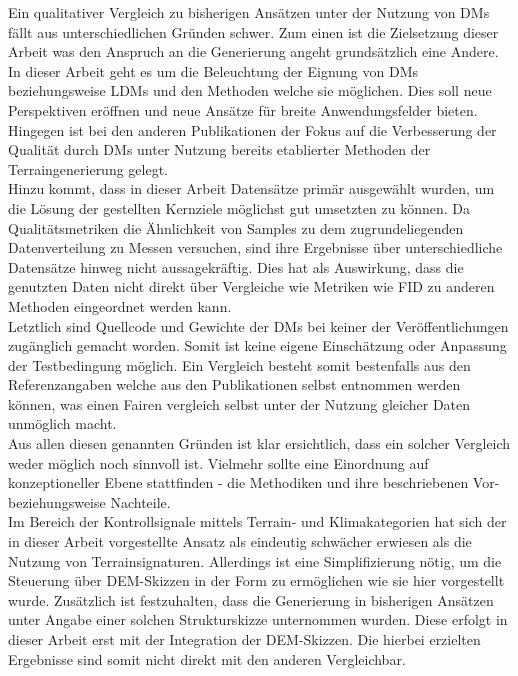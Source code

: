 Ein qualitativer Vergleich zu bisherigen Ansätzen unter der Nutzung von \ac{DM}s fällt aus unterschiedlichen Gründen schwer. Zum einen ist die Zielsetzung dieser Arbeit was den Anspruch an die Generierung angeht grundsätzlich eine Andere. In dieser Arbeit geht es um die Beleuchtung der Eignung von \ac{DM}s beziehungsweise \ac{LDM}s und den Methoden welche sie möglichen. Dies soll neue Perspektiven eröffnen und neue Ansätze für breite Anwendungsfelder bieten. Hingegen ist bei den anderen Publikationen der Fokus auf die Verbesserung der Qualität durch \ac{DM}s unter Nutzung bereits etablierter Methoden der Terraingenerierung gelegt. \\
Hinzu kommt, dass in dieser Arbeit Datensätze primär ausgewählt wurden, um die Lösung der gestellten Kernziele möglichst gut umsetzten zu können. Da Qualitätsmetriken die Ähnlichkeit von Samples zu dem zugrundeliegenden Datenverteilung zu Messen versuchen, sind ihre Ergebnisse über unterschiedliche Datensätze hinweg nicht aussagekräftig. Dies hat als Auswirkung, dass die genutzten Daten nicht direkt über Vergleiche wie Metriken wie FID zu anderen Methoden eingeordnet werden kann.\\ 
Letztlich sind Quellcode und Gewichte der \ac{DM}s bei keiner der Veröffentlichungen zugänglich gemacht worden. Somit ist keine eigene Einschätzung oder Anpassung der Testbedingung möglich. Ein Vergleich besteht somit bestenfalls aus den Referenzangaben welche aus den Publikationen selbst entnommen werden können, was einen Fairen vergleich selbst unter der Nutzung gleicher Daten unmöglich macht. \\
Aus allen diesen genannten Gründen ist klar ersichtlich, dass ein solcher Vergleich weder möglich noch sinnvoll ist. Vielmehr sollte eine Einordnung auf konzeptioneller Ebene stattfinden - die Methodiken und ihre beschriebenen Vor- beziehungsweise Nachteile. \\
Im Bereich der Kontrollsignale mittels Terrain- und Klimakategorien hat sich der in dieser Arbeit vorgestellte Ansatz als eindeutig schwächer erwiesen als die Nutzung von Terrainsignaturen. Allerdings ist eine Simplifizierung nötig, um die Steuerung über \ac{DEM}-Skizzen in der Form zu ermöglichen wie sie hier vorgestellt wurde. Zusätzlich ist festzuhalten, dass die Generierung in bisherigen Ansätzen unter Angabe einer solchen Strukturskizze unternommen wurden. Diese erfolgt in dieser Arbeit erst mit der Integration der \ac{DEM}-Skizzen. Die hierbei erzielten Ergebnisse sind somit nicht direkt mit den anderen Vergleichbar. \\
